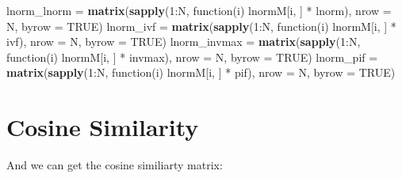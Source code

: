 \documentclass[10pt]{report}
\newenvironment{Shaded}{}{}
\newcommand{\KeywordTok}[1]{\textcolor[rgb]{0.00,0.44,0.13}{\textbf{{#1}}}}
\newcommand{\DataTypeTok}[1]{\textcolor[rgb]{0.56,0.13,0.00}{{#1}}}
\newcommand{\DecValTok}[1]{\textcolor[rgb]{0.25,0.63,0.44}{{#1}}}
\newcommand{\StringTok}[1]{\textcolor[rgb]{0.25,0.44,0.63}{{#1}}}
\newcommand{\OtherTok}[1]{\textcolor[rgb]{0.00,0.44,0.13}{{#1}}}
\newcommand{\NormalTok}[1]{{#1}}
\begin{document}
\begin{Shaded}
\begin{Highlighting}[]
\NormalTok{lnorm_lnorm =}\StringTok{ }\KeywordTok{matrix}\NormalTok{(}\KeywordTok{sapply}\NormalTok{(}\DecValTok{1}\NormalTok{:N, function(i) lnormM[i, ] *}\StringTok{ }\NormalTok{lnorm), }\DataTypeTok{nrow =} \NormalTok{N, }
    \DataTypeTok{byrow =} \OtherTok{TRUE}\NormalTok{)}
\NormalTok{lnorm_ivf =}\StringTok{ }\KeywordTok{matrix}\NormalTok{(}\KeywordTok{sapply}\NormalTok{(}\DecValTok{1}\NormalTok{:N, function(i) lnormM[i, ] *}\StringTok{ }\NormalTok{ivf), }\DataTypeTok{nrow =} \NormalTok{N, }\DataTypeTok{byrow =} \OtherTok{TRUE}\NormalTok{)}
\NormalTok{lnorm_invmax =}\StringTok{ }\KeywordTok{matrix}\NormalTok{(}\KeywordTok{sapply}\NormalTok{(}\DecValTok{1}\NormalTok{:N, function(i) lnormM[i, ] *}\StringTok{ }\NormalTok{invmax), }\DataTypeTok{nrow =} \NormalTok{N, }
    \DataTypeTok{byrow =} \OtherTok{TRUE}\NormalTok{)}
\NormalTok{lnorm_pif =}\StringTok{ }\KeywordTok{matrix}\NormalTok{(}\KeywordTok{sapply}\NormalTok{(}\DecValTok{1}\NormalTok{:N, function(i) lnormM[i, ] *}\StringTok{ }\NormalTok{pif), }\DataTypeTok{nrow =} \NormalTok{N, }\DataTypeTok{byrow =} \OtherTok{TRUE}\NormalTok{)}
\end{Highlighting}
\end{Shaded}

\section{Cosine Similarity}\label{cosine-similarity}

And we can get the cosine similiarty matrix:

\begin{Shaded}
\end{Shaded}
\end{document}
